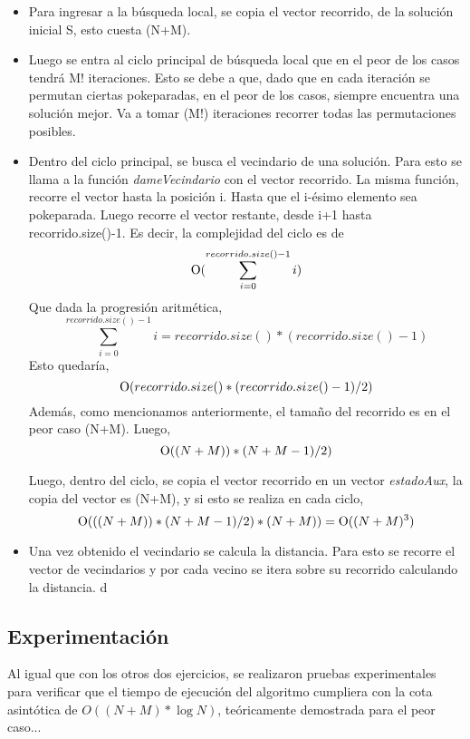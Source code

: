         \begin{itemize}
            \item Para ingresar a la búsqueda local, se copia el vector recorrido, de la solución inicial S, esto cuesta \ord(N+M).
            \item Luego se entra al ciclo principal de búsqueda local que en el peor de los casos tendrá M! iteraciones. Esto se debe a que, dado que en cada iteración se permutan ciertas pokeparadas, en el peor de los casos, siempre encuentra una solución mejor. Va a tomar \ord(M!) iteraciones recorrer todas las permutaciones posibles.
            \item Dentro del ciclo principal, se busca el vecindario de una solución. Para esto se llama a la función \emph{dameVecindario} con el vector recorrido.
            La misma función, recorre el vector hasta la posición i. Hasta que el i-ésimo elemento sea pokeparada. Luego recorre el vector restante, desde i+1 hasta recorrido.size()-1. Es decir, la complejidad del ciclo es de 
            \[
            \operatorname{O}(\sum_{i=0}^{recorrido.size()-1} i)
            \]
            Que dada la progresión aritmética,
            \[
            \sum_{i=0}^{recorrido.size()-1} i = recorrido.size()*(recorrido.size()-1)
            \]
            Esto quedaría,
            \[
            \operatorname{O}(recorrido.size()*(recorrido.size()-1)/2)
            \]
            Además, como mencionamos anteriormente, el tamaño del recorrido es en el peor caso \ord(N+M). Luego,
            \[
            \operatorname{O}((N+M))*(N+M-1)/2)
            \]

            Luego, dentro del ciclo, se copia el vector recorrido en un vector \emph{estadoAux}, la copia del vector es \ord(N+M), y si esto se realiza en cada ciclo,
             \[
            \operatorname{O}(((N+M))*(N+M-1)/2)*(N+M)) = \operatorname{O}((N+M)^{3})
            \]

            \item Una vez obtenido el vecindario se calcula la distancia. Para esto se recorre el vector de vecindarios y por cada vecino se itera sobre su recorrido calculando la distancia. d


        \end{itemize}

    


    \subsection{Experimentación}

        Al igual que con los otros dos ejercicios, se realizaron pruebas experimentales para verificar que el tiempo de ejecución del algoritmo cumpliera con la cota asintótica de $O((N+M) * \log N)$, teóricamente demostrada para el peor caso...